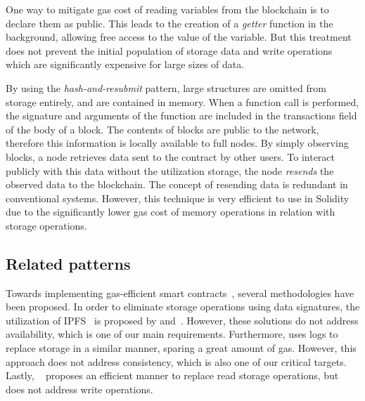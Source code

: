 One way to mitigate gas cost of reading variables
from the blockchain is to declare them as public. This leads to the creation of a
\emph{getter} function in the background, allowing free access to the value of
the variable. But this treatment does not prevent the initial population of
storage data and write operations which are significantly expensive for large
sizes of data.

By using the \emph{hash-and-resubmit} pattern, large structures are omitted
from storage entirely, and are contained in memory. When a function call is
performed, the signature and arguments of the function are included in the
transactions field of the body of a block. The contents of blocks are public to
the network, therefore this information is locally available to full nodes. By
simply observing blocks, a node retrieves data sent to the contract by other
users. To interact publicly with this data without the utilization storage, the
node \emph{resends} the observed data to the blockchain. The concept of
resending data is redundant in conventional systems. However, this technique
is very efficient to use in Solidity due to the significantly lower gas cost
of memory operations in relation with storage operations.

\subsection{Related patterns} Towards implementing gas-efficient smart
contracts~\cite{contract-opt-1, contract-opt-2, slither, madmax}, several
methodologies have been proposed. In order to eliminate storage operations
using data signatures, the utilization of IPFS~\cite{ipfs} is proposed by
\cite{ipfs-1} and~\cite{ipfs-2}. However, these solutions do not address
availability, which is one of our main requirements. Furthermore,
\cite{logs} uses logs to replace storage in a similar manner, sparing a great
amount of gas. However, this approach does not address consistency, which is
also one of our critical targets. Lastly, ~\cite{memory-array} proposes an
efficient manner to replace read storage operations, but does not address write
operations.

